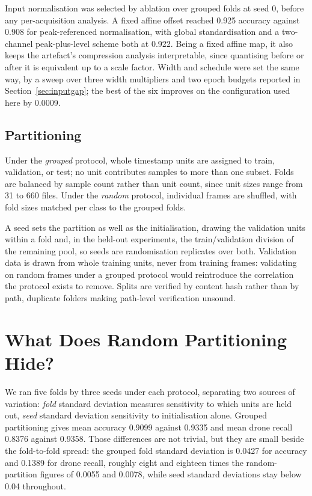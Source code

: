 \documentclass[conference]{IEEEtran}
\begin{document}
Input normalisation was selected by ablation over grouped folds at seed 0, before any per-acquisition analysis. A fixed affine offset reached 0.925 accuracy against 0.908 for peak-referenced normalisation, with global standardisation and a two-channel peak-plus-level scheme both at 0.922. Being a fixed affine map, it also keeps the artefact's compression analysis interpretable, since quantising before or after it is equivalent up to a scale factor. Width and schedule were set the same way, by a sweep over three width multipliers and two epoch budgets reported in Section~\ref{sec:inputgap}; the best of the six improves on the configuration used here by 0.0009.

\subsection{Partitioning}

Under the \emph{grouped} protocol, whole timestamp units are assigned to train, validation, or test; no unit contributes samples to more than one subset. Folds are balanced by sample count rather than unit count, since unit sizes range from 31 to 660 files. Under the \emph{random} protocol, individual frames are shuffled, with fold sizes matched per class to the
grouped folds.

A seed sets the partition as well as the initialisation, drawing the validation units within a fold and, in the held-out experiments, the train/validation division of the remaining pool, so seeds are randomisation replicates over both. Validation data is drawn from whole training units, never from training frames: validating on random frames under a grouped protocol would reintroduce the correlation the protocol exists to remove. Splits are verified by content hash rather than by path, duplicate folders making path-level verification unsound.

\section{What Does Random Partitioning Hide?}
\label{sec:leak}

We ran five folds by three seeds under each protocol, separating two sources of variation: \emph{fold} standard deviation measures sensitivity to which units are held out, \emph{seed} standard deviation sensitivity to initialisation alone. Grouped partitioning gives mean accuracy 0.9099 against 0.9335 and mean drone recall 0.8376 against 0.9358. Those differences are not trivial, but they are small beside the fold-to-fold spread: the grouped fold standard deviation is 0.0427 for accuracy and 0.1389 for drone recall, roughly eight and eighteen times the random-partition figures of 0.0055 and 0.0078, while seed standard deviations stay below 0.04 throughout.
\end{document}
